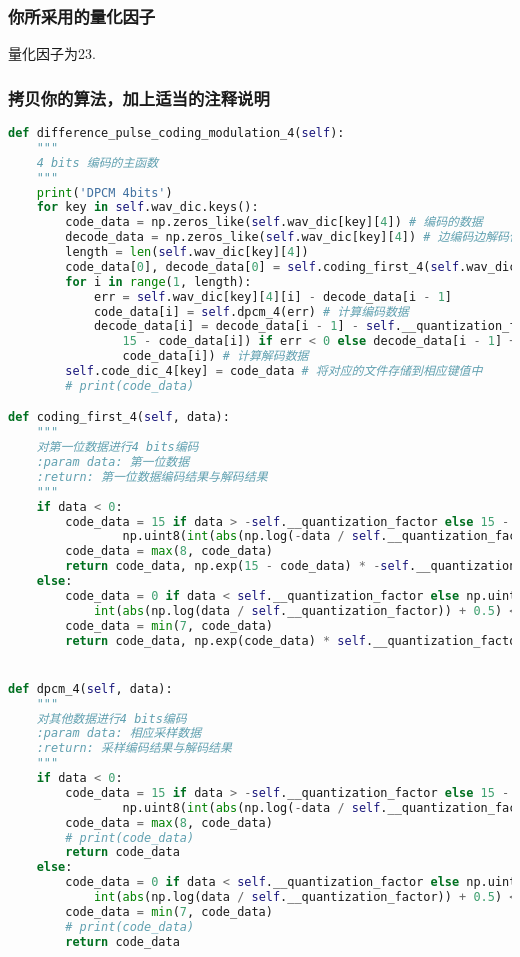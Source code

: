 \documentclass{hitreport}
\begin{document}
\subsubsection{你所采用的量化因子}

量化因子为23.

\subsubsection{拷贝你的算法，加上适当的注释说明}

\begin{lstlisting}[language=python]
def difference_pulse_coding_modulation_4(self):
	"""
	4 bits 编码的主函数
	"""
    print('DPCM 4bits')
    for key in self.wav_dic.keys():
        code_data = np.zeros_like(self.wav_dic[key][4]) # 编码的数据
        decode_data = np.zeros_like(self.wav_dic[key][4]) # 边编码边解码保存的临时数据
        length = len(self.wav_dic[key][4])
        code_data[0], decode_data[0] = self.coding_first_4(self.wav_dic[key][4][0]) # 对第一位特殊处理，计算编码和解码数据
        for i in range(1, length):
            err = self.wav_dic[key][4][i] - decode_data[i - 1]
            code_data[i] = self.dpcm_4(err) # 计算编码数据
            decode_data[i] = decode_data[i - 1] - self.__quantization_factor * np.exp(
                15 - code_data[i]) if err < 0 else decode_data[i - 1] + self.__quantization_factor * np.exp(
                code_data[i]) # 计算解码数据
        self.code_dic_4[key] = code_data # 将对应的文件存储到相应键值中
        # print(code_data)

def coding_first_4(self, data):
    """
    对第一位数据进行4 bits编码
    :param data: 第一位数据
    :return: 第一位数据编码结果与解码结果
    """
    if data < 0:
        code_data = 15 if data > -self.__quantization_factor else 15 - (
                np.uint8(int(abs(np.log(-data / self.__quantization_factor)) + 0.5) << 4) >> 4) # 若采样值小于零
        code_data = max(8, code_data)
        return code_data, np.exp(15 - code_data) * -self.__quantization_factor
    else:
        code_data = 0 if data < self.__quantization_factor else np.uint8(
            int(abs(np.log(data / self.__quantization_factor)) + 0.5) << 4) >> 4 # 若采样值大于零
        code_data = min(7, code_data)
        return code_data, np.exp(code_data) * self.__quantization_factor


def dpcm_4(self, data):
    """
    对其他数据进行4 bits编码
    :param data: 相应采样数据
    :return: 采样编码结果与解码结果
    """
    if data < 0:
        code_data = 15 if data > -self.__quantization_factor else 15 - (
                np.uint8(int(abs(np.log(-data / self.__quantization_factor)) + 0.5) << 4) >> 4) # 若采样值小于零
        code_data = max(8, code_data)
        # print(code_data)
        return code_data
    else:
        code_data = 0 if data < self.__quantization_factor else np.uint8(
            int(abs(np.log(data / self.__quantization_factor)) + 0.5) << 4) >> 4 # 若采样值大于零
        code_data = min(7, code_data)
        # print(code_data)
        return code_data
\end{lstlisting}
\end{document}
